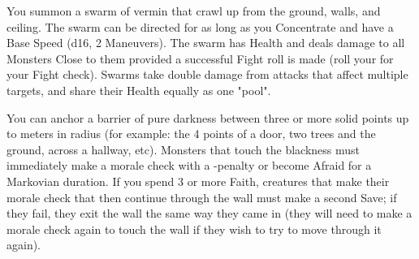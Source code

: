 \MYSTERY [
  Name = Vermin Swarm,
  Link = arcana-mystery-vermin-swarm,
  Paradigm = Biomancy,
  Save = n/a,
  Duration = Concentration,
  Target = Close or Nearby
]

You summon a swarm of vermin that crawl up from the ground, walls, and ceiling.  The swarm can be directed for as long as you Concentrate and have a Base Speed (d16, 2 Maneuvers).  The swarm has \SUMDICE Health and deals \DICE damage to all Monsters Close to them provided a successful Fight roll is made (roll your \FOC for your Fight check).  Swarms take double damage from attacks that affect multiple targets, and share their Health equally as one "pool".  

\MYSTERY [
  Name = Wall of Gloom,
  Link = arcana-mystery-wall-of-gloom,
  Paradigm = Mind,
  Save = See Below,
  Duration = Markovian,
  Target = Nearby or Far-Away
]

You can anchor a barrier of pure darkness between three or more solid points up to \DICE meters in radius (for example: the 4 points of a door, two trees and the ground, across a hallway, etc).  Monsters that touch the blackness must immediately make a morale check with a -\DICE penalty or become Afraid for a Markovian duration.  If you spend 3 or more Faith, creatures that make their morale check that then continue through the wall must make a second Save; if they fail, they exit the wall the same way they came in (they will need to make a morale check again to touch the wall if they wish to try to move through it again).   

